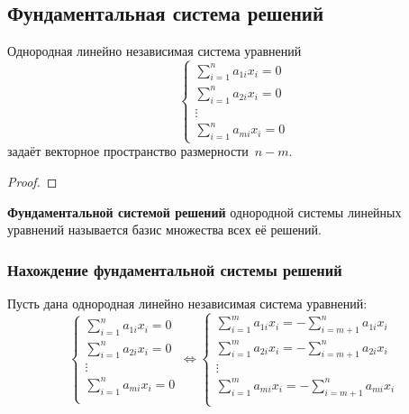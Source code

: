

\subsection{Фундаментальная система решений}
\begin{statement}
Однородная линейно независимая система уравнений
\begin{equation*}
\begin{cases}
\displaystyle \sum_{i=1}^n a_{1i} x_i = 0 \\
\displaystyle \sum_{i=1}^n a_{2i} x_i = 0 \\
\vdots \\
\displaystyle \sum_{i=1}^n a_{mi} x_i = 0
\end{cases}
\end{equation*}
задаёт векторное пространство размерности~$n - m$.
\end{statement}
\begin{proof}

\end{proof}

\textbf{Фундаментальной системой решений} однородной системы линейных уравнений называется базис множества всех её решений.

\subsubsection{Нахождение фундаментальной системы решений}
Пусть дана однородная линейно независимая система уравнений:
\begin{equation*}
\begin{cases}
\displaystyle \sum_{i=1}^n a_{1i} x_i = 0 \\
\displaystyle \sum_{i=1}^n a_{2i} x_i = 0 \\
\vdots \\
\displaystyle \sum_{i=1}^n a_{mi} x_i = 0 \\
\end{cases} \Leftrightarrow
\begin{cases}
\displaystyle \sum_{i=1}^m a_{1i} x_i = -\sum_{i=m+1}^n a_{1i} x_i \\
\displaystyle \sum_{i=1}^m a_{2i} x_i = -\sum_{i=m+1}^n a_{2i} x_i \\
\vdots \\
\displaystyle \sum_{i=1}^m a_{mi} x_i = -\sum_{i=m+1}^n a_{mi} x_i \\
\end{cases}
\end{equation*}

